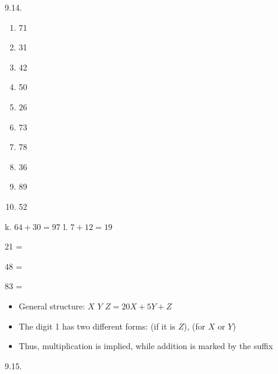 \begin{refsection}
\begin{practiceproblemsolution}{9.14. \langnameAlamblak}
\begin{solutions}[label=Solution 9.14\alph*]
\begin{multicols}{5}
        \begin{enumerate}[label = \alph*.]
            \item 71
            \item 31
            \item 42
            \item 50
            \item 26
            \item 73
            \item 78
            \item 36
            \item 89
            \item 52
        \end{enumerate}
    \end{multicols}
    \item k. $64+30=97$ \quad\quad\quad\quad\quad\quad l. $7+12=19$
    \item 21 = 
    \item[] 48 = 
    \item[] 83 = 
\end{solutions}

\begin{itemize}
    \item General structure:  $X$ $Y$ $Z = 20X + 5Y + Z$
    \item The digit 1 has two different forms:  (if it is $Z$),  (for $X$ or $Y$)
    \item Thus, multiplication is implied, while addition is marked by the suffix 
\end{itemize}
\end{practiceproblemsolution}

\begin{practiceproblemsolution}{9.15. \langnameChabu}


\end{practiceproblemsolution}
\end{refsection}
